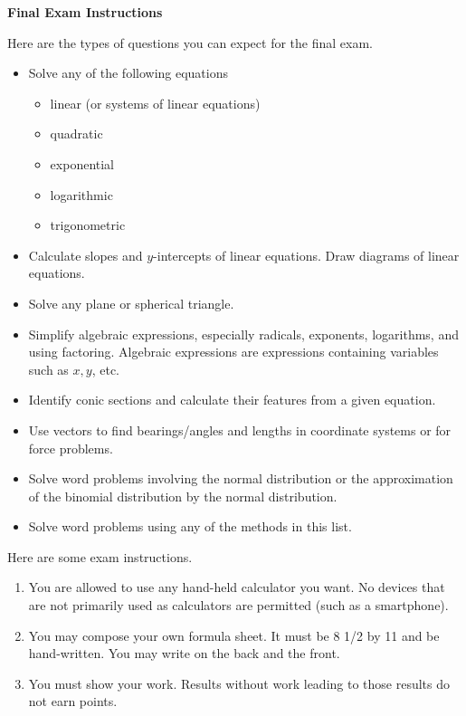 \documentclass[11pt]{article}
\begin{document}
\textbf{Final Exam Instructions}

Here are the types of questions you can expect for the final exam.

\begin{itemize}
\item Solve any of the following equations
  \begin{itemize}
  \item linear (or systems of linear equations)
  \item quadratic
  \item exponential
  \item logarithmic
  \item trigonometric
  \end{itemize}
\item Calculate slopes and $y$-intercepts of linear equations. Draw
  diagrams of linear equations.
\item Solve any plane or spherical triangle.
\item Simplify algebraic expressions, especially radicals, exponents,
  logarithms, and using factoring. Algebraic expressions are
  expressions containing variables such as $x,y$, etc.
\item Identify conic sections and calculate their features from a
  given equation.
\item Use vectors to find bearings/angles and lengths in coordinate
  systems or for force problems.
\item Solve word problems involving the normal distribution or the
  approximation of the binomial distribution by the normal
  distribution.
\item Solve word problems using any of the methods in this list.
\end{itemize}

Here are some exam instructions.

\begin{enumerate}
\item You are allowed to use any hand-held calculator you want. No
  devices that are not primarily used as calculators are permitted
  (such as a smartphone).
\item You may compose your own formula sheet. It must be 8 1/2 by 11
  and be hand-written. You may write on the back and the front.
\item You must show your work. Results without work leading to those
  results do not earn points.
\end{enumerate}
\end{document}
